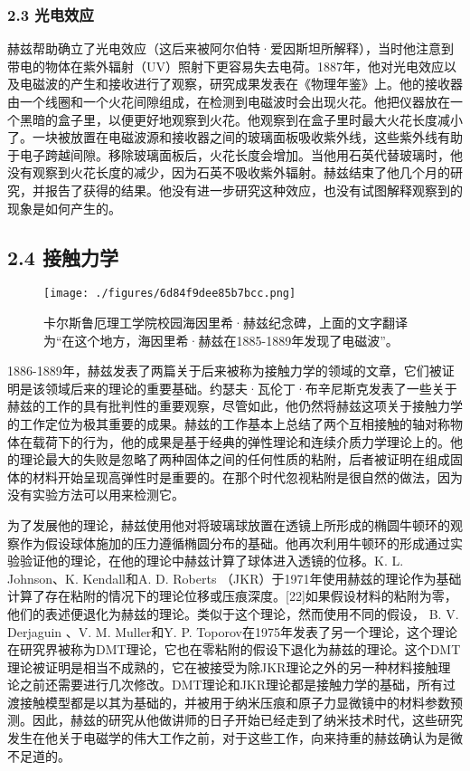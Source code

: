 \subsubsection{2.3 光电效应}
赫兹帮助确立了光电效应（这后来被阿尔伯特·爱因斯坦所解释），当时他注意到带电的物体在紫外辐射（UV）照射下更容易失去电荷。1887年，他对光电效应以及电磁波的产生和接收进行了观察，研究成果发表在《物理年鉴》上。他的接收器由一个线圈和一个火花间隙组成，在检测到电磁波时会出现火花。他把仪器放在一个黑暗的盒子里，以便更好地观察到火花。他观察到在盒子里时最大火花长度减小了。一块被放置在电磁波源和接收器之间的玻璃面板吸收紫外线，这些紫外线有助于电子跨越间隙。移除玻璃面板后，火花长度会增加。当他用石英代替玻璃时，他没有观察到火花长度的减少，因为石英不吸收紫外辐射。赫兹结束了他几个月的研究，并报告了获得的结果。他没有进一步研究这种效应，也没有试图解释观察到的现象是如何产生的。

\subsection{2.4 接触力学}
\begin{figure}[ht]
\centering
\texttt{[image: ./figures/6d84f9dee85b7bcc.png]}
\caption{卡尔斯鲁厄理工学院校园海因里希·赫兹纪念碑，上面的文字翻译为“在这个地方，海因里希·赫兹在1885-1889年发现了电磁波”。} \label{fig_Hertz_9}
\end{figure}
1886-1889年，赫兹发表了两篇关于后来被称为接触力学的领域的文章，它们被证明是该领域后来的理论的重要基础。约瑟夫·瓦伦丁·布辛尼斯克发表了一些关于赫兹的工作的具有批判性的重要观察，尽管如此，他仍然将赫兹这项关于接触力学的工作定位为极其重要的成果。赫兹的工作基本上总结了两个互相接触的轴对称物体在载荷下的行为，他的成果是基于经典的弹性理论和连续介质力学理论上的。他的理论最大的失败是忽略了两种固体之间的任何性质的粘附，后者被证明在组成固体的材料开始呈现高弹性时是重要的。在那个时代忽视粘附是很自然的做法，因为没有实验方法可以用来检测它。

为了发展他的理论，赫兹使用他对将玻璃球放置在透镜上所形成的椭圆牛顿环的观察作为假设球体施加的压力遵循椭圆分布的基础。他再次利用牛顿环的形成通过实验验证他的理论，在他的理论中赫兹计算了球体进入透镜的位移。K. L. Johnson、K. Kendall和A. D. Roberts （JKR）于1971年使用赫兹的理论作为基础计算了存在粘附的情况下的理论位移或压痕深度。[22]如果假设材料的粘附为零，他们的表述便退化为赫兹的理论。类似于这个理论，然而使用不同的假设， B. V. Derjaguin 、V. M. Muller和Y. P. Toporov在1975年发表了另一个理论，这个理论在研究界被称为DMT理论，它也在零粘附的假设下退化为赫兹的理论。这个DMT理论被证明是相当不成熟的，它在被接受为除JKR理论之外的另一种材料接触理论之前还需要进行几次修改。DMT理论和JKR理论都是接触力学的基础，所有过渡接触模型都是以其为基础的，并被用于纳米压痕和原子力显微镜中的材料参数预测。因此，赫兹的研究从他做讲师的日子开始已经走到了纳米技术时代，这些研究发生在他关于电磁学的伟大工作之前，对于这些工作，向来持重的赫兹确认为是微不足道的。

